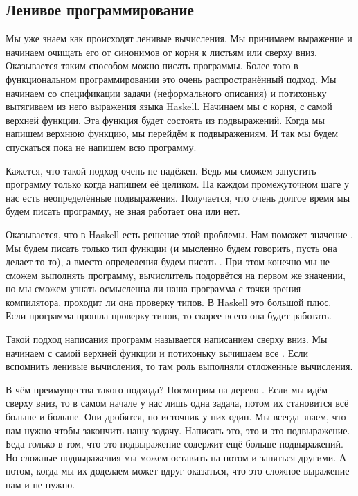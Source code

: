 \subsection{Ленивое программирование}

Мы уже знаем как происходят ленивые вычисления. Мы принимаем
выражение и начинаем очищать его от синонимов от корня к листьям
или сверху вниз. Оказывается таким способом можно писать программы.
Более того в функциональном программировании это очень
распространённый подход. Мы начинаем со спецификации задачи
(неформального описания) и потихоньку вытягиваем из него 
выражения языка Haskell. Начинаем мы с корня, с самой верхней
функции. Эта функция будет состоять из подвыражений. Когда
мы напишем верхнюю функцию, мы перейдём к подвыражениям. 
И так мы будем спускаться пока не напишем всю программу.

Кажется, что такой подход очень не надёжен. Ведь мы сможем
запустить программу только когда напишем её целиком.
На каждом промежуточном шаге у нас есть неопределённые подвыражения.
Получается, что очень долгое время мы будем писать программу,
не зная работает она или нет. 

Оказывается, что в Haskell есть решение этой проблемы. Нам 
поможет значение . Мы будем писать
только тип функции (и мысленно будем говорить, пусть она 
делает то-то), а вместо определения будем писать .
При этом конечно мы не сможем выполнять программу, вычислитель
подорвётся на первом же значении, но мы сможем узнать осмысленна
ли наша программа с точки зрения компилятора, проходит
ли она проверку типов. В Haskell это большой плюс. Если программа
прошла проверку типов, то скорее всего она будет работать.

Такой подход написания программ называется написанием
сверху вниз. Мы начинаем с самой верхней функции и потихоньку
вычищаем все . Если вспомнить ленивые вычисления,
то там роль  выполняли отложенные вычисления.

В чём преимущества такого подхода? Посмотрим на дерево 
.
Если мы идём сверху вниз, то в самом начале у нас лишь 
одна задача, потом их становится всё больше и больше.
Они дробятся, но источник у них один. Мы всегда знаем, что
нам нужно чтобы закончить нашу задачу. Написать это,
это и это подвыражение. Беда только в том, что это подвыражение
содержит ещё больше подвыражений. Но сложные подвыражения
мы можем оставить на потом и заняться другими. А потом, когда
мы их доделаем может вдруг оказаться, что это сложное выражение 
нам и не нужно. 

